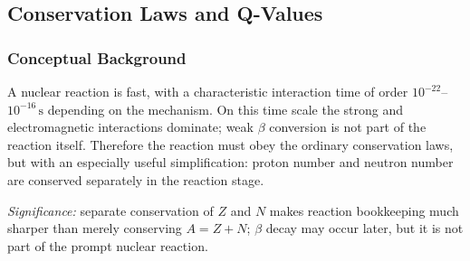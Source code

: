 
\subsection{Conservation Laws and Q-Values}
\label{subsec:lec10:conservation_q}

\subsubsection*{Conceptual Background}
A nuclear reaction is fast, with a characteristic interaction time of order
$10^{-22}$--$10^{-16}\,\text{s}$ depending on the mechanism. On this time scale
the strong and electromagnetic interactions dominate; weak $\beta$ conversion is
not part of the reaction itself. Therefore the reaction must obey the ordinary
conservation laws, but with an especially useful simplification: proton number
and neutron number are conserved separately in the reaction stage.

\textit{Significance:} separate conservation of $Z$ and $N$ makes reaction
bookkeeping much sharper than merely conserving $A=Z+N$; $\beta$ decay may occur
later, but it is not part of the prompt nuclear reaction.

